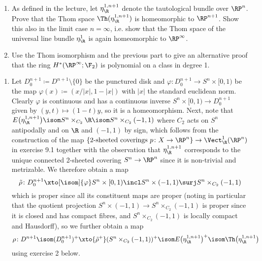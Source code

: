 \begin{exercise}\label{ex:thomspacerpn}
	\leavevmode
	\begin{enumerate}
		\item As defined in the lecture, let $\eta_\R^{1, n + 1}$ denote the tautological bundle over $\RP^n$.
			Prove that the Thom space $\Th(\eta_\R^{1, n + 1})$ is homeomorphic to $\RP^{n + 1}$.
			Show this also in the limit case $n = \infty$, i.e. show that the Thom space of the universal line bundle $\eta_\R^1$ is again homeomorphic to $\RP^\infty$.
		\item Use the Thom isomorphism and the previous part to give an alternative proof that the ring $H^*(\RP^\infty; \F_2)$ is polynomial on a class in degree 1.
	\end{enumerate}
\end{exercise}
\begin{solution}
	\leavevmode
	\begin{enumerate}
		\item Let $D^{n + 1}_0 \coloneq D^{n + 1} \setminus \{0\}$ be the punctured disk and $\varphi\colon D^{n + 1}_0 \to S^n \times [0, 1)$ be the map $\varphi(x) \coloneq (x / |x|, 1 - |x|)$ with $|x|$ the standard euclidean norm.
			Clearly $\varphi$ is continuous and has a continuous inverse $S^n \times [0, 1) \to D^{n + 1}_0$ given by $(y, t) \mapsto (1 - t) y$, so it is a homeomorphism.
			Next, note that $E\big(\eta_\R^{1, n + 1}\big) \isom S^n \times_{C_2} \R \isom S^n \times_{C_2} (-1, 1)$ where $C_2$ acts on $S^n$ antipodally and on $\R$ and $(-1, 1)$ by sign, which follows from the construction of the map $\{\text{2-sheeted coverings } p\colon X \to \RP^n\} \to \Vect_\R^1(\RP^n)$ in exercise 9.1 together with the observation that $\eta_\R^{1, n + 1}$ corresponds to the unique connected 2-sheeted covering $S^n \to \RP^n$ since it is non-trivial and metrizable.
			We therefore obtain a map 
			\begin{equation*}
				\tilde{\rho}\colon D^{n + 1}_0 \xto[\isom]{\varphi} S^n \times [0, 1) \incl S^n \times (-1, 1) \surj S^n \times_{C_2} (-1, 1)
			\end{equation*}
			which is proper since all its constituent maps are proper (noting in particular that the quotient projection $S^n \times (-1, 1) \to S^n \times_{C_2} (-1, 1)$ is proper since it is closed and has compact fibres, and $S^n \times_{C_2} (-1, 1)$ is locally compact and Hausdorff), so we further obtain a map 
			\begin{equation*}
				\rho\colon D^{n + 1} \isom (D^{n + 1}_0)^+ \xto{\tilde{\rho}^+} (S^n \times_{C_2} (-1, 1))^+ \isom E\big(\eta_\R^{1, n + 1}\big)^+ \isom \Th\big(\eta_\R^{1, n + 1}\big)
			\end{equation*}
			using exercise 2 below.


\end{enumerate}
\end{solution}
